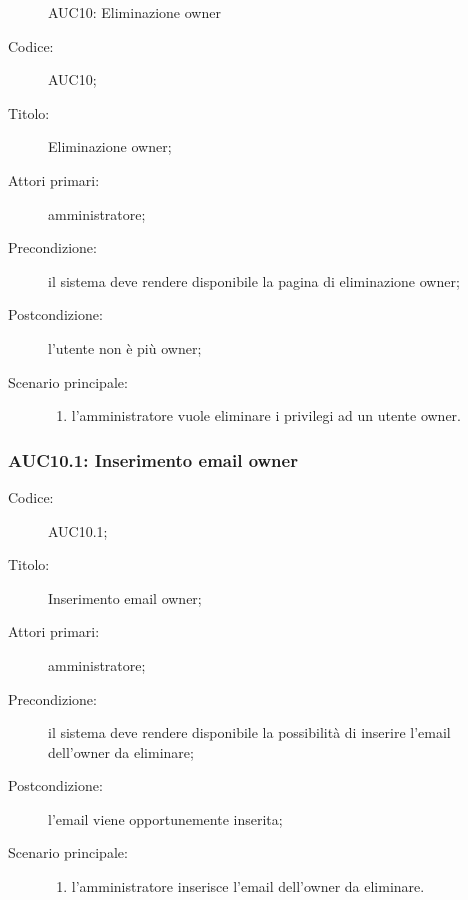 \documentclass[../../../analisi-dei-requisiti.tex]{subfiles}
\begin{document}
\begin{figure}[H]
  \centering
  \caption{AUC10: Eliminazione owner}%
  \label{fig:AUC10}
\end{figure}

\begin{description}
  \item[Codice:] AUC10;
  \item[Titolo:] Eliminazione owner;
  \item[Attori primari:] amministratore;
  \item[Precondizione:] il sistema deve rendere disponibile la pagina di eliminazione owner;
  \item[Postcondizione:] l'utente non è più owner;
  \item[Scenario principale:]
  \begin{enumerate}
    \item l'amministratore vuole eliminare i privilegi ad un utente owner.
  \end{enumerate}
\end{description}

\subsubsection{AUC10.1: Inserimento email owner}%
\label{subs:AUC10.1}
\begin{description}
  \item[Codice:] AUC10.1;
  \item[Titolo:] Inserimento email owner;
  \item[Attori primari:] amministratore;
  \item[Precondizione:] il sistema deve rendere disponibile la possibilità di inserire l'email dell'owner da eliminare;
  \item[Postcondizione:] l'email viene opportunemente inserita;
  \item[Scenario principale:]
  \begin{enumerate}
    \item l'amministratore inserisce l'email dell'owner da eliminare.
  \end{enumerate}
\end{description}
\end{document}
